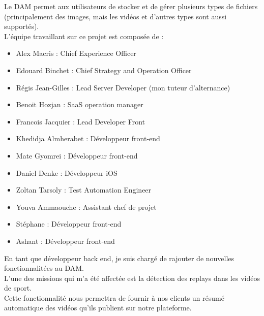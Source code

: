 \documentclass[11pt]{article}
\begin{document}
Le DAM permet aux utilisateurs de stocker et de gérer plusieurs types de fichiers (principalement des images, mais les vidéos et d’autres types sont aussi supportés).\\
L’équipe travaillant sur ce projet est composée de :\\
\begin{itemize}
\item Alex Macris : Chief Experience Officer\\
\item Edouard Binchet : Chief Strategy and Operation Officer\\
\item Régis Jean-Gilles : Lead Server Developer (mon tuteur d'alternance)\\
\item Benoit Hozjan : SaaS operation manager\\
\item Francois Jacquier : Lead Developer Front\\
\item Khedidja Almherabet : Développeur front-end\\
\item Mate Gyomrei : Développeur front-end\\
\item Daniel Denke : Développeur iOS\\
\item Zoltan Tarsoly : Test Automation Engineer\\
\item Youva Ammaouche : Assistant chef de projet\\
\item Stéphane : Développeur front-end\\
\item Ashant : Développeur front-end\\
\end{itemize}

En tant que développeur back end, je suis chargé de rajouter de nouvelles fonctionnalitées au DAM.\\
L'une des missions qui m'a été affectée est la détection des replays dans les vidéos de sport.\\
Cette fonctionnalité nous permettra de fournir à nos clients un résumé automatique des vidéos qu'ils publient sur notre plateforme.\\

\newpage
\end{document}
